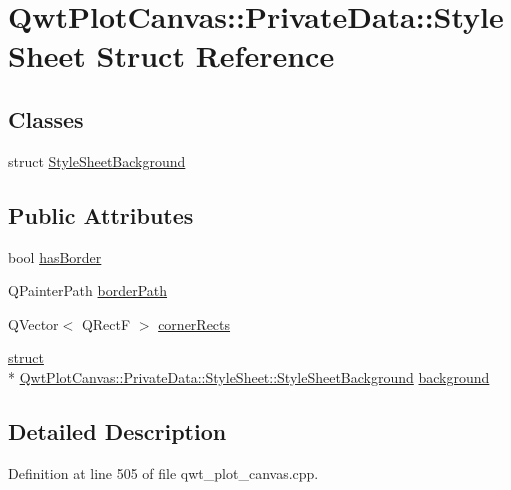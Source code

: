 \hypertarget{struct_qwt_plot_canvas_1_1_private_data_1_1_style_sheet}{\section{Qwt\-Plot\-Canvas\-:\-:Private\-Data\-:\-:Style\-Sheet Struct Reference}
\label{struct_qwt_plot_canvas_1_1_private_data_1_1_style_sheet}
}
\subsection*{Classes}
\begin{DoxyCompactItemize}
\item 
struct \hyperlink{struct_qwt_plot_canvas_1_1_private_data_1_1_style_sheet_1_1_style_sheet_background}{Style\-Sheet\-Background}
\end{DoxyCompactItemize}
\subsection*{Public Attributes}
\begin{DoxyCompactItemize}
\item 
bool \hyperlink{struct_qwt_plot_canvas_1_1_private_data_1_1_style_sheet_a43317a68815a44f79dc025d3594bd0dc}{has\-Border}
\item 
Q\-Painter\-Path \hyperlink{struct_qwt_plot_canvas_1_1_private_data_1_1_style_sheet_a2f6b6f49f6bf25960225a40512bb4206}{border\-Path}
\item 
Q\-Vector$<$ Q\-Rect\-F $>$ \hyperlink{struct_qwt_plot_canvas_1_1_private_data_1_1_style_sheet_ab47219e8d22ef67c230985f8e9f9664d}{corner\-Rects}
\item 
\hyperlink{sdlgamepad_8dox_aba655c5729da86df745f0c8e7f9ba8d2}{struct} \\*
\hyperlink{struct_qwt_plot_canvas_1_1_private_data_1_1_style_sheet_1_1_style_sheet_background}{Qwt\-Plot\-Canvas\-::\-Private\-Data\-::\-Style\-Sheet\-::\-Style\-Sheet\-Background} \hyperlink{struct_qwt_plot_canvas_1_1_private_data_1_1_style_sheet_a9f312698dc61e2243eaea5197e7d53d6}{background}
\end{DoxyCompactItemize}


\subsection{Detailed Description}


Definition at line 505 of file qwt\-\_\-plot\-\_\-canvas.\-cpp.



